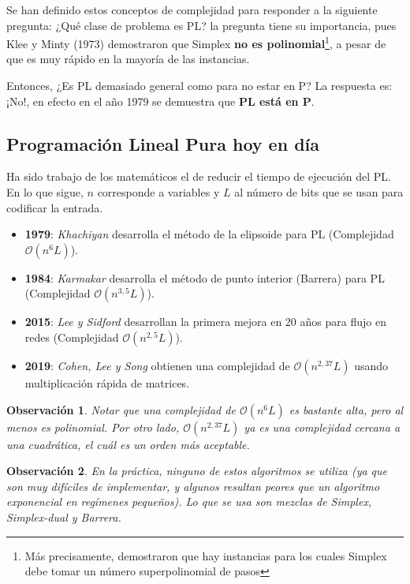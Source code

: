 \documentclass[10pt]{article}
\newcommand{\Ord}[1][n]{\ensuremath{ \mathcal{O}(#1) }}
\theoremstyle{plain}
\newtheorem{obs}{Observaci\'on}
\theoremstyle{definition}
\begin{document}
Se han definido estos conceptos de complejidad para responder a la siguiente pregunta: ¿Qué clase de problema es PL? la pregunta tiene su importancia, pues Klee y Minty (1973) demostraron que Simplex \textbf{no es polinomial}\footnote{Más precisamente, demostraron que hay instancias para los cuales Simplex debe tomar un número superpolinomial de pasos}, a pesar de que es muy rápido en la mayoría de las instancias.

Entonces, ¿Es PL demasiado general como para no estar en P? La respuesta es: ¡No!, en efecto en el año 1979 se demuestra que \textbf{PL está en P}.

\subsection*{Programación Lineal Pura hoy en día}
Ha sido trabajo de los matemáticos el de reducir el tiempo de ejecución del PL. En lo que sigue, $n$ corresponde a variables y $L$ al número de bits que se usan para codificar la entrada.
\begin{itemize}
    \item \textbf{1979}: \textit{Khachiyan} desarrolla el método de la elipsoide para PL (Complejidad $\Ord[n^6L]$).
    \item \textbf{1984}: \textit{Karmakar} desarrolla el método de punto interior (Barrera) para PL (Complejidad $\Ord[n^{3,5}L]$).
    \item \textbf{2015}: \textit{Lee y Sidford} desarrollan la primera mejora en 20 años para flujo en redes (Complejidad $\Ord[n^{2,5}L]$).
    \item \textbf{2019}: \textit{Cohen, Lee y Song} obtienen una complejidad de $\Ord[n^{2,37}L]$ usando multiplicación rápida de matrices.
\end{itemize}

\begin{obs}
Notar que una complejidad de \Ord[n^6 L] es bastante alta, pero al menos es polinomial. Por otro lado, \Ord[n^{2,37} L] ya es una complejidad cercana a una cuadrática, el cuál es un orden más aceptable.
\end{obs}

\begin{obs}
En la práctica, ninguno de estos algoritmos se utiliza (ya que son muy difíciles de implementar, y algunos resultan peores que un algoritmo exponencial en regímenes pequeños). Lo que se usa son mezclas de Simplex, Simplex-dual y Barrera.
\end{obs}
\end{document}
